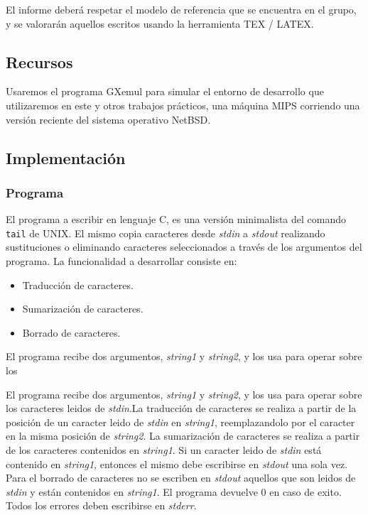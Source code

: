 \documentclass[a4paper,10pt]{article}
\begin{document}
El informe deber\'{a} respetar el modelo de referencia que se encuentra en el grupo, y se valorar\'{a}n aquellos escritos usando la herramienta TEX / LATEX.

\subsection{Recursos}
Usaremos el programa GXemul para simular el entorno de desarrollo que utilizaremos en este y otros trabajos pr\'{a}cticos, una m\'{a}quina MIPS corriendo una versi\'{o}n reciente del sistema operativo NetBSD. 

\newpage
\newpage

\subsection{Implementaci\'{o}n}
\subsubsection{Programa}
El programa a escribir en lenguaje C, es una versi\'{o}n minimalista del comando \texttt{tail} de UNIX. El mismo copia caracteres desde \textit{stdin} a \textit{stdout} realizando sustituciones o eliminando caracteres seleccionados a trav\'{e}s de los argumentos del programa.
La funcionalidad a desarrollar consiste en:

\begin{itemize}
\item Traducci\'{o}n de caracteres.
\item Sumarizaci\'{o}n de caracteres.
\item Borrado de caracteres.
\end{itemize}

El programa recibe dos argumentos, \textit{string1} y \textit{string2}, y los usa para operar sobre los

El programa recibe dos argumentos, \textit{string1} y \textit{string2}, y los usa para operar sobre los caracteres leidos de \textit{stdin}.La traducci\'{o}n de caracteres se realiza a partir de la posici\'{o}n de un caracter leido de \textit{stdin} en \textit{string1}, reemplazandolo por el caracter en la misma posici\'{o}n de \textit{string2}.
La sumarizaci\'{o}n de caracteres se realiza a partir de los caracteres contenidos en \textit{string1}. Si un caracter leido de \textit{stdin} est\'{a} contenido en \textit{string1}, entonces el mismo debe escribirse en \textit{stdout} una sola vez.
Para el borrado de caracteres no se escriben en \textit{stdout} aquellos que son leidos de \textit{stdin} y est\'{a}n contenidos en \textit{string1}.
El programa devuelve 0 en caso de exito. Todos los errores deben escribirse en \textit{stderr}.
\end{document}
